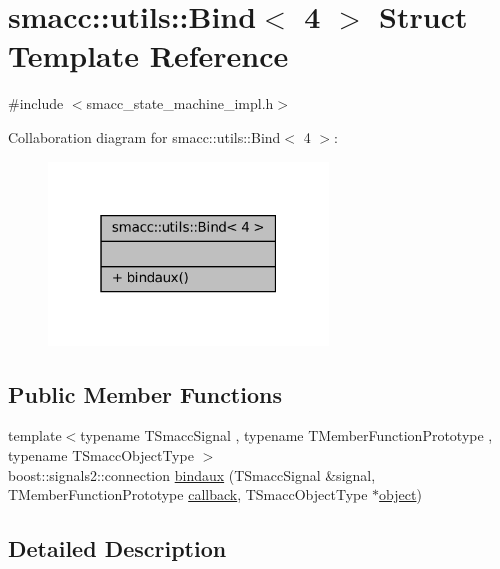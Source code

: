 \hypertarget{structsmacc_1_1utils_1_1Bind_3_014_01_4}{}\section{smacc\+:\+:utils\+:\+:Bind$<$ 4 $>$ Struct Template Reference}
\label{structsmacc_1_1utils_1_1Bind_3_014_01_4}


{\ttfamily \#include $<$smacc\+\_\+state\+\_\+machine\+\_\+impl.\+h$>$}



Collaboration diagram for smacc\+:\+:utils\+:\+:Bind$<$ 4 $>$\+:
\nopagebreak
\begin{figure}[H]
\begin{center}
\leavevmode
\includegraphics[width=211pt]{structsmacc_1_1utils_1_1Bind_3_014_01_4__coll__graph}
\end{center}
\end{figure}
\subsection*{Public Member Functions}
\begin{DoxyCompactItemize}
\item 
{\footnotesize template$<$typename T\+Smacc\+Signal , typename T\+Member\+Function\+Prototype , typename T\+Smacc\+Object\+Type $>$ }\\boost\+::signals2\+::connection \hyperlink{structsmacc_1_1utils_1_1Bind_3_014_01_4_af999b2ea156fad369be761be47f83f18}{bindaux} (T\+Smacc\+Signal \&signal, T\+Member\+Function\+Prototype \hyperlink{3_2servers_2opencv__perception__node_2opencv__perception__node_8cpp_a050e697bd654facce10ea3f6549669b3}{callback}, T\+Smacc\+Object\+Type $\ast$\hyperlink{classobject}{object})
\end{DoxyCompactItemize}


\subsection{Detailed Description}

